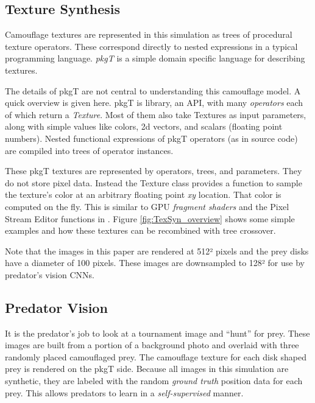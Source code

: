 \documentclass[acmtog,
    anonymous,
    review
    ]{acmart}
\newcommand{\jargon}[1]{\textit{#1}}
\newcommand{\texsyn}[0]{pkgT}
\begin{document}
\subsection{Texture Synthesis}
\label{subsec:texture_synthesis}
Camouflage textures are represented in this simulation as trees of procedural texture operators. These correspond directly to nested expressions in a typical programming language. \jargon{\texsyn{}} is a simple domain specific language for describing textures.
\par
The details of \texsyn{} are not central to understanding this camouflage model. A quick overview is given here. \texsyn{} is library, an API, with many \jargon{operators} each of which return a \jargon{Texture}. Most of them also take Textures as input parameters, along with simple values like colors, 2d vectors, and scalars (floating point numbers). Nested functional expressions of \texsyn{} operators (as in source code) are compiled into trees of operator instances.
\par
These \texsyn{} textures are represented by operators, trees, and parameters. They do not store pixel data. Instead the Texture class provides a function to sample the texture's color at an arbitrary floating point \textit{xy} location. That color is computed on the fly. This is similar to GPU \jargon{fragment shaders} and the Pixel Stream Editor functions in \citet{perlin_image_1985}. Figure \ref{fig:TexSyn_overview} shows some simple examples and how these textures can be recombined with tree crossover.
\par
Note that the images in this paper are rendered at 512² pixels and the prey disks have a diameter of 100 pixels. These images are downsampled to 128² for use by predator's vision CNNs.
\par


\subsection{Predator Vision}
It is the predator's job to look at a tournament image and “hunt” for prey. These images are built from a portion of a background photo and overlaid with three randomly placed camouflaged prey. The camouflage texture for each disk shaped prey is rendered on the \texsyn{} side. Because all images in this simulation are synthetic, they are labeled with the random \jargon{ground truth} position data for each prey. This allows predators to learn in a \jargon{self-supervised} manner.
\par
\end{document}
